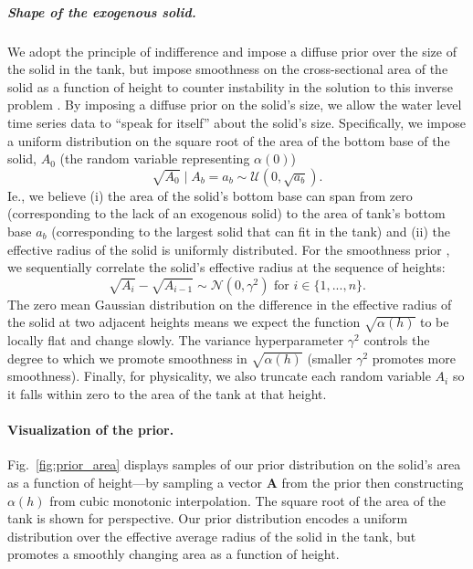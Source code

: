 \documentclass[openacc]{rsproca_new}%
\begin{document}
\vspace{-\baselineskip}
\subparagraph{Shape of the exogenous solid.}
We adopt the principle of indifference and impose a diffuse prior over the size of the solid in the tank, but impose smoothness on the cross-sectional area of the solid as a function of height to counter instability in the solution to this inverse problem \cite{groetsch1993inverse}. 
By imposing a diffuse prior on the solid's size, we allow the water level time series data to ``speak for itself'' about the solid's size.
Specifically, we impose a uniform distribution on the square root of the area of the bottom base of the solid, $A_0$ (the random variable representing $\alpha(0)$)
\begin{equation}
	\sqrt{A_0} \mid A_b=a_b \sim \mathcal{U}(0, \sqrt{a_b}).
\end{equation}
Ie., we believe 
(i) the area of the solid's bottom base can span from zero (corresponding to the lack of an exogenous solid) to the area of tank's bottom base $a_b$ (corresponding to the largest solid that can fit in the tank) and
(ii) the effective radius of the solid is uniformly distributed.
For the smoothness prior \cite{calvetti2018inverse}, we sequentially correlate the solid's effective radius at the sequence of heights: 
\begin{equation}
 \sqrt{A_i} - \sqrt{A_{i-1}} \sim \mathcal{N}(0, \gamma^2) \text{ for } i \in \{1, ..., n\}.
\end{equation} 
The zero mean Gaussian distribution on the difference in the effective radius of the solid at two adjacent heights means we expect the function $\sqrt{\alpha(h)}$ to be locally flat and change slowly. 
The variance hyperparameter $\gamma^2$ controls the degree to which we promote smoothness in $\sqrt{\alpha (h)}$ (smaller $\gamma^2$ promotes more smoothness). 
Finally, for physicality, we also truncate each random variable $A_i$ so it falls within zero to the area of the tank at that height.

\paragraph{Visualization of the prior.}
Fig.~\ref{fig:prior_area} displays samples of our prior distribution on the solid's area as a function of height---by sampling a vector $\mathbf{A}$ from the prior then constructing $\alpha(h)$ from cubic monotonic interpolation. The square root of the area of the tank is shown for perspective. 
Our prior distribution encodes a uniform distribution over the effective average radius of the solid in the tank, but promotes a smoothly changing area as a function of height. 
\end{document}
